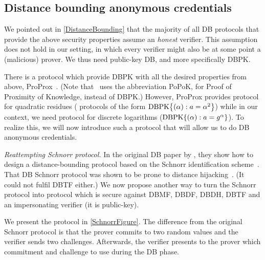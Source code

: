 \subsection{Distance bounding anonymous credentials}%
\label{DB-anon-cred}


We pointed out in \cref{DistanceBounding} that the majority of all \ac{DB} protocols that provide the above security properties assume an \emph{honest} verifier.
This assumption does not hold in our setting, in which every verifier might also be at some point a (malicious) prover.
We thus need public-key \ac{DB}, and more specifically \ac{DBPK}.

There is a protocol which provide \ac{DBPK} with all the desired properties from 
above, ProProx~\cite{ProProx}.
(Note that~\cite{ProProx} uses the abbreviation PoPoK, for Proof of Proximity of 
Knowledge, instead of \ac{DBPK}.)
However, ProProx provides  protocol for quadratic residues (\ie 
protocols of the form \(\DBPK[\alpha][a = \alpha^2]\)) while in our context, we 
need  protocol for discrete logarithms (\ie \(\DBPK[\alpha][a = 
  g^\alpha]\)).
To realize this, we will now introduce such a protocol that will allow us to do 
\ac{DB} anonymous credentials.


\emph{Reattempting  Schnorr protocol.}
In the original \ac{DB} paper by \citet{DistanceBounding}, they show how to 
design a distance-bounding protocol based on the Schnorr identification 
scheme~\cite{Schnorr}.
That \ac{DB} Schnorr protocol was shown to be prone to distance 
hijacking~\cite{DistanceHijacking}.
(It could not fulfil \ac{DBTF} either.)
We now propose another way to turn the Schnorr protocol into  protocol 
which is secure against \ac{DBMF}, \ac{DBDF}, \ac{DBDH}, \ac{DBTF} and an 
impersonating verifier (\ie it is public-key).

We present the protocol in \cref{SchnorrFigure}.
The difference from the original Schnorr protocol is that the prover commits to two random values and the verifier sends two challenges.
Afterwards, the verifier presents to the prover which commitment and challenge to use during the \ac{DB} phase.

